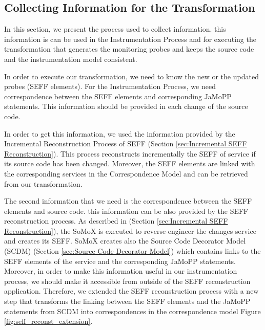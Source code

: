 \subsection{Collecting Information for the Transformation}
\label{sec:Collecting Information for the Transformation}
In this section, we present the process used to collect information. this information is can be used in the Instrumentation Process and for executing the transformation that generates the monitoring probes and keeps the source code and the instrumentation model consistent.

In order to execute our transformation, we need to know the new or the updated probes (SEFF elements).  For the Instrumentation Process, we need correspondence between the SEFF elements and corresponding JaMoPP statements. This information should be provided in each change of the source code. 

In order to get this information, we used the information provided by the Incremental Reconstruction Process of SEFF (Section \ref{sec:Incremental SEFF Reconstruction}). This process reconstructs incrementally the SEFF of service if its source code has been changed. Moreover, the SEFF elements are linked with the corresponding services in the Correspondence Model and can be retrieved from our transformation.

The second information that we need is the correspondence between the SEFF elements and source code. this information can be also provided by the SEFF reconstruction process. As described in (Section \ref{sec:Incremental SEFF Reconstruction}), the SoMoX is executed to reverse-engineer the changes service and creates its SEFF. SoMoX creates also the Source Code Decorator Model (SCDM) (Section \ref{sec:Source Code Decorator Model}) which contains links to the SEFF elements of the service and the corresponding JaMoPP statements. Moreover, in order to make this information useful in our instrumentation process, we should make it accessible from outside of the SEFF reconstruction application. Therefore, we extended the SEFF reconstruction process with a new step that transforms the linking between the SEFF elements and the JaMoPP statements from SCDM into correspondences in the correspondence model Figure \ref{fig:seff_reconst_extension}. 


